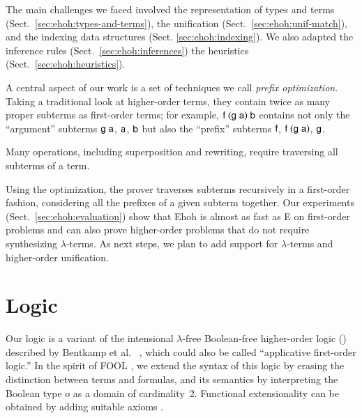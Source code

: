 The main challenges we faced involved the
representation of types and terms
(Sect.~\ref{sec:ehoh:types-and-terms}), the unification
(Sect.~\ref{sec:ehoh:unif-match}), and the indexing data structures
(Sect. \ref{sec:ehoh:indexing}). We also adapted the
inference rules (Sect.~\ref{sec:ehoh:inferences}) the
heuristics (Sect.~\ref{sec:ehoh:heuristics}).

A central aspect of our work is a set of techniques we call
\emph{prefix optimization}. Taking a traditional look at higher-order terms, they contain twice as many proper
subterms as first-order terms; for example,
$\mathsf{f}\;(\mathsf{g}\;\mathsf{a})\;\mathsf{b}$ contains not only the ``argument'' subterms
$\mathsf{g}\;\mathsf{a}$, $\mathsf{a}$, $\mathsf{b}$ but also the ``prefix'' subterms
$\mathsf{f}$, $\mathsf{f}\;(\mathsf{g}\;\mathsf{a})$, $\mathsf{g}$.
\begin{rep}Many operations, including superposition and rewriting, require
traversing all subterms of a term.\end{rep}
Using the optimization, the prover traverses subterms recursively in a
first-order fashion, considering all the prefixes of a given subterm
together. %
%
Our experiments (Sect.~\ref{sec:ehoh:evaluation}) show that Ehoh is
almost as fast as E on first-order problems and can also prove
higher-order problems that do not require synthesizing
$\lambda$-terms. As next steps, we plan to add support for
$\lambda$-terms and higher-order unification.

\section{Logic}
\label{sec:ehoh:logic}

Our logic is a variant of the intensional $\lambda$-free Boolean-free higher-order
logic (\lfhol{}) described by Bentkamp et al.\ %
\cite[Sect.~2]{bbcw-21-lfho}, which could also be called ``applicative
first-order logic.'' In the spirit of FOOL \cite{kotelnikov-16-fool}, we
extend the syntax of this logic by erasing the distinction between terms and
formulas, and its semantics by interpreting the Boolean type $o$ as a domain
of cardinality~2. Functional extensionality can be obtained by adding
suitable axioms \cite[Sect.~3.1]{bbcw-21-lfho}.


